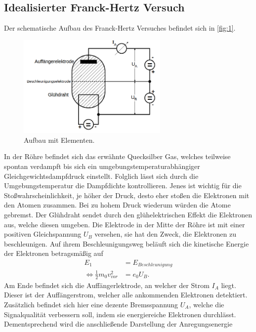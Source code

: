 \subsection{Idealisierter Franck-Hertz Versuch}
Der schematische Aufbau des Franck-Hertz Versuches befindet sich in \autoref{fig:1}.
\begin{figure}[H]
    \centering
        \centering
        \includegraphics[width=0.65\textwidth]{Bilder/fha.png}
        \caption{Aufbau mit Elementen. \cite{anleitung5}}
    \hfill
    \label{fig:1}
\end{figure}
\noindent In der Röhre befindet sich das erwähnte Quecksilber Gas, welches
teilweise spontan verdampft bis sich ein umgebungstemperaturabhängiger 
Gleichgewichtsdampfdruck einstellt. Folglich lässt sich durch 
die Umgebungstemperatur die Dampfdichte kontrollieren. Jenes ist wichtig für die
Stoßwahrscheinlichkeit, je höher der Druck, desto eher stoßen die Elektronen
mit den Atomen zusammen. Bei zu hohem Druck wiederum würden die Atome gebremst. 
Der Glühdraht sendet durch den glühelektrischen Effekt die Elektronen aus, welche 
diesen umgeben. Die Elektrode in der Mitte der Röhre ist mit einer positiven
Gleichspannung $U_B$ versehen, sie hat den Zweck, die Elektronen zu beschleunigen.
Auf ihrem Beschleunigungsweg beläuft sich die kinetische Energie der Elektronen 
betragsmäßig auf
\begin{align}
    E_1 &= E_{Beschleunigung} \\
    \Longleftrightarrow \frac{1}{2} m_0 v_{vor}^2 &= e_0 U_B.
\end{align}
\noindent Am Ende befindet sich die Auffängerlektrode, an welcher der Strom 
$I_A$ liegt. Dieser ist der Auffängerstrom, welcher alle ankommenden Elektronen 
detektiert. Zusätzlich befindet sich hier eine dezente Bremsspannung $U_A$,
welche die Signalqualität verbessern soll, indem sie energiereiche Elektronen 
durchlässt. Dementsprechend wird die anschließende Darstellung der Anregungsenergie 
